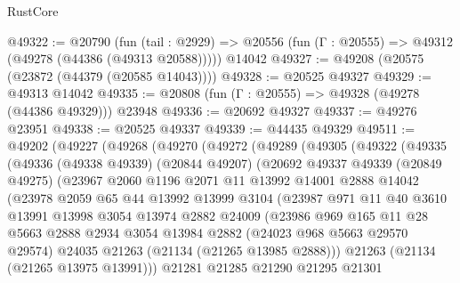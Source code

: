 \begin{lexlean}{RustCore}
\begin{coremodule}
@49322 := @20790
    (fun (tail : @2929) => @20556 (fun (Γ : @20555) => @49312 (@49278 (@44386 (@49313 @20588)))))
    @14042
@49327 := @49208 (@20575 (@23872 (@44379 (@20585 @14043))))
@49328 := @20525 @49327
@49329 := @49313 @14042
@49335 := @20808 (fun (Γ : @20555) => @49328 (@49278 (@44386 @49329))) @23948
@49336 := @20692 @49327
@49337 := @49276 @23951
@49338 := @20525 @49337
@49339 := @44435 @49329
@49511 := @49202
    (@49227
      (@49268
        (@49270
          (@49272
            (@49289
              (@49305
                (@49322
                  (@49335
                    (@49336
                      (@49338 @49339)
                      (@20844 @49207)
                      (@20692
                        @49337
                        @49339
                        (@20849 @49275)
                        (@23967
                          @2060
                          @1196
                          @2071
                          @11
                          @13992
                          @14001
                          @2888
                          @14042
                          (@23978
                            @2059
                            @65
                            @44
                            @13992
                            @13999
                            @3104
                            (@23987
                              @971
                              @11
                              @40
                              @3610
                              @13991
                              @13998
                              @3054
                              @13974
                              @2882
                              @24009
                              (@23986
                                @969
                                @165
                                @11
                                @28
                                @5663
                                @2888
                                @2934
                                @3054
                                @13984
                                @2882
                                (@24023 @968 @5663 @29570 @29574)
                                @24035
                                @21263
                                (@21134 (@21265 @13985 @2888)))
                              @21263
                              (@21134 (@21265 @13975 @13991)))
                            @21281
                            @21285
                            @21290
                            @21295
                            @21301

\end{coremodule}
\end{lexlean}
